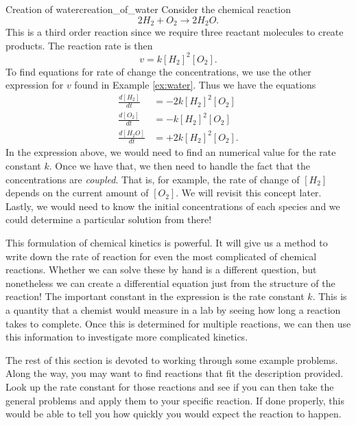         \begin{ex}{Creation of water}{creation_of_water}
            Consider the chemical reaction
            \[
                2H_2 + O_2 \to 2H_2 O.
            \]
            This is a third order reaction since we require three reactant molecules to create products. The reaction rate is then
            \[
                v=k[H_2]^2 [O_2].
            \]
            To find equations for rate of change the concentrations, we use the other expression for $v$ found in Example \ref{ex:water}. Thus we have the equations
            \begin{align*}
                \frac{d[H_2]}{dt} &= -2 k [H_2]^2 [O_2]\\
                \frac{d[O_2]}{dt} &= -k[H_2]^2[O_2]\\
                \frac{d[H_2O]}{dt} &= +2k [H_2]^2[O_2].
            \end{align*}
            In the expression above, we would need to find an numerical value for the rate constant $k$. Once we have that, we then need to handle the fact that the concentrations are \emph{coupled}. That is, for example, the rate of change of $[H_2]$ depends on the current amount of $[O_2]$.  We will revisit this concept later. Lastly, we would need to know the initial concentrations of each species and we could determine a particular solution from there!
        \end{ex}

        This formulation of chemical kinetics is powerful.  It will give us a method to write down the rate of reaction for even the most complicated of chemical reactions.  Whether we can solve these by hand is a different question, but nonetheless we can create a differential equation just from the structure of the reaction! The important constant in the expression is the rate constant $k$.  This is a quantity that a chemist would measure in a lab by seeing how long a reaction takes to complete.  Once this is determined for multiple reactions, we can then use this information to investigate more complicated kinetics.

        The rest of this section is devoted to working through some example problems.  Along the way, you may want to find reactions that fit the description provided.  Look up the rate constant for those reactions and see if you can then take the general problems and apply them to your specific reaction. If done properly, this would be able to tell you how quickly you would expect the reaction to happen.
        
